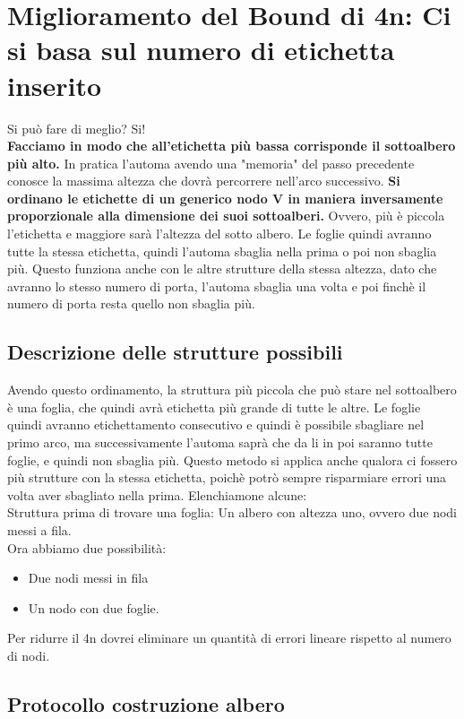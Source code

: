 \section{Miglioramento del Bound di 4n: Ci si basa sul numero di etichetta inserito}

Si può fare di meglio? Si!\\ \textbf{Facciamo in modo che all'etichetta più bassa corrisponde il sottoalbero più alto.}
In pratica l'automa avendo una "memoria" del passo precedente conosce la massima altezza che dovrà percorrere nell'arco successivo.
\textbf{Si ordinano le etichette di un generico nodo V in maniera inversamente proporzionale alla dimensione dei suoi sottoalberi.} Ovvero, più è piccola l'etichetta e maggiore sarà l'altezza del sotto albero. Le foglie quindi avranno tutte la stessa etichetta, quindi l'automa sbaglia nella prima o poi non sbaglia più. Questo funziona anche con le altre strutture della stessa altezza, dato che avranno lo stesso numero di porta, l'automa sbaglia una volta e poi finchè il numero di porta resta quello non sbaglia più.

\subsection{Descrizione delle strutture possibili}
Avendo questo ordinamento, la struttura più piccola che può stare nel sottoalbero è una foglia, che quindi avrà etichetta più grande di tutte le altre. Le foglie quindi avranno etichettamento consecutivo e quindi è possibile sbagliare nel primo arco, ma successivamente l'automa saprà che da li in poi saranno tutte foglie, e quindi non sbaglia più. Questo metodo si applica anche qualora ci fossero più strutture con la stessa etichetta, poichè potrò sempre risparmiare errori una volta aver sbagliato nella prima. Elenchiamone alcune:\\
Struttura prima di trovare una foglia: Un albero con altezza uno, ovvero due nodi messi a fila.\\
Ora abbiamo due possibilità:
\begin{itemize}
  \item Due nodi messi in fila
  \item Un nodo con due foglie.
\end{itemize}
Per ridurre il 4n dovrei eliminare un quantità di errori lineare rispetto al numero di nodi.
\subsection{Protocollo costruzione albero}

